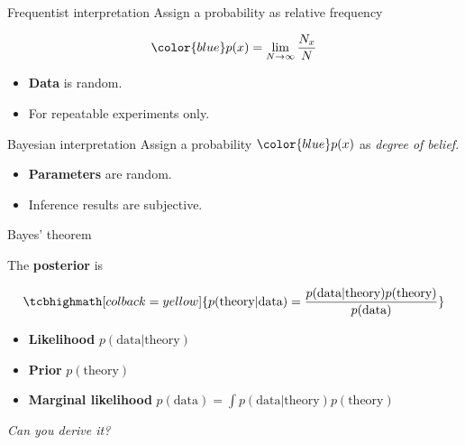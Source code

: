 \documentclass[
aspectratio=169,
14pt,
professionalfonts
]{beamer}
\begin{document}
\begin{frame}{Frequentist interpretation}
    Assign a probability as relative frequency

        $$ \color{blue}
        p(x) = \lim_{N\to\infty} \frac{N_x}{N}
        $$

        \begin{itemize}
            \item \textbf{Data} is random.
            \item For repeatable experiments only.
        \end{itemize}
\end{frame}

\begin{frame}{Bayesian interpretation}
    Assign a probability $\color{blue} p(x)$ as \textit{degree of belief}.
    \begin{itemize}
        \item \textbf{Parameters} are random.
        \item Inference results are subjective.
    \end{itemize}
\end{frame}

\begin{frame}{Bayes' theorem}

The \textbf{posterior} is

$$
\tcbhighmath[colback=yellow]{
p(\text{theory} | \text{data}) = \frac{p(\text{data}|\text{theory}) p(\text{theory})}{p(\text{data})}
}
$$

\begin{itemize}
    \item \textbf{Likelihood} $p(\text{data}|\text{theory})$
    \item \textbf{Prior} $p(\text{theory})$
    \item \textbf{Marginal likelihood} ${p(\text{data}) = \int p(\text{data}|\text{theory}) p(\text{theory})}$
\end{itemize}
\begin{flushright}
    \textit{Can you derive it?}
\end{flushright}
\end{frame}
\end{document}
